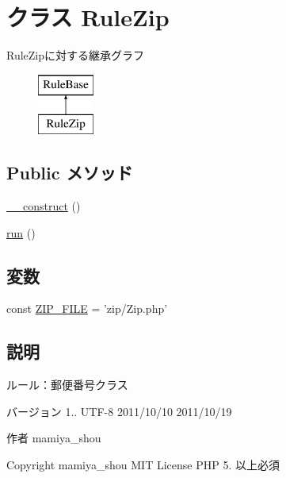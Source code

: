 \hypertarget{class_rule_zip}{
\section{クラス \-Rule\-Zip}
\label{class_rule_zip}
}
\-Rule\-Zipに対する継承グラフ\begin{figure}[H]
\begin{center}
\leavevmode
\includegraphics[height=2.000000cm]{class_rule_zip}
\end{center}
\end{figure}
\subsection*{\-Public メソッド}
\begin{DoxyCompactItemize}
\item 
\hyperlink{class_rule_zip_a095c5d389db211932136b53f25f39685}{\-\_\-\-\_\-construct} ()
\item 
\hyperlink{class_rule_zip_afb0fafe7e02a3ae1993c01c19fad2bae}{run} ()
\end{DoxyCompactItemize}
\subsection*{変数}
\begin{DoxyCompactItemize}
\item 
const \hyperlink{class_rule_zip_ab168cbeba579bbfed03fe9f7b039d3ee}{\-Z\-I\-P\-\_\-\-F\-I\-L\-E} = 'zip/\-Zip.\-php'
\end{DoxyCompactItemize}


\subsection{説明}
ルール：郵便番号クラス

\begin{DoxyVersion}{バージョン}
1..  \-U\-T\-F-\/8  2011/10/10  2011/10/19 
\end{DoxyVersion}
\begin{DoxyAuthor}{作者}
mamiya\-\_\-shou 
\end{DoxyAuthor}
\begin{DoxyCopyright}{\-Copyright}
mamiya\-\_\-shou  \-M\-I\-T \-License  \-P\-H\-P 5. 以上必須 
\end{DoxyCopyright}


